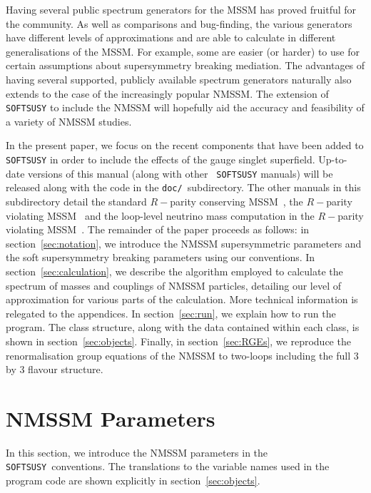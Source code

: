 \documentclass[final,3p,times,pdflatex]{elsarticle}
\def\SOFTSUSY{{\tt SOFTSUSY}}
\begin{document}
Having several public spectrum generators for the MSSM has proved fruitful for
the community. As well as comparisons and bug-finding, the various generators
have different levels of approximations and are able to calculate in different
generalisations of the MSSM. For example, some are easier (or harder) to use for certain
assumptions about supersymmetry breaking mediation. 
The advantages of having
several supported, publicly available spectrum generators naturally also
extends to the 
case of the increasingly popular NMSSM.
The extension of {\tt SOFTSUSY} to include the
NMSSM will hopefully aid the
accuracy and feasibility of a variety of NMSSM studies. 

In the present paper, we focus on the recent components that have been added to
{\tt SOFTSUSY} in order to include the effects of the gauge singlet
superfield. Up-to-date versions of this manual (along with other {\tt
  SOFTSUSY} manuals) 
will be released along with the
code in the {\tt doc/}~subdirectory. The other manuals in this subdirectory detail the standard
$R-$parity conserving MSSM~\cite{Allanach:2001kg}, 
the $R-$parity violating MSSM~\cite{Allanach:2009bv} and the loop-level
neutrino mass 
computation in the $R-$parity violating MSSM~\cite{Allanach:2011de}.
The remainder of the paper proceeds as follows: in section~\ref{sec:notation}, we
introduce the NMSSM supersymmetric parameters and the soft supersymmetry
breaking 
parameters using our conventions.  In section~\ref{sec:calculation}, we describe
the algorithm 
employed to calculate the spectrum of masses and couplings of NMSSM
particles, detailing our level of approximation for various parts of the
calculation. More technical information is relegated to the appendices. In
section~\ref{sec:run}, we explain how to run the program. The class structure,
along with the data contained within each class, is shown in
section~\ref{sec:objects}. Finally, in section~\ref{sec:RGEs}, we reproduce
the renormalisation group equations of the NMSSM to two-loops including the
full 3 by 3 flavour structure. 

\section{NMSSM Parameters \label{sec:notation}}

In this section, we introduce the NMSSM parameters
in the \SOFTSUSY~conventions. The translations to the variable
names used in the program code are shown explicitly in
section~\ref{sec:objects}.  
\end{document}
